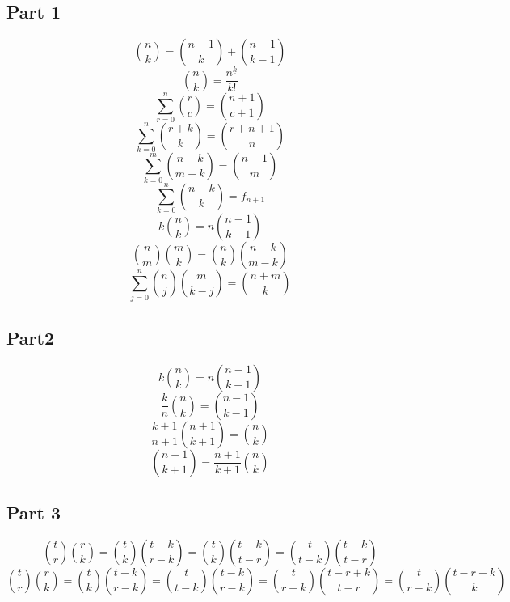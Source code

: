 
\subsection{Part 1}\label{subsec:part-1}
$$\binom{n}{k} = \binom{n-1}{k} + \binom{n-1}{k-1}$$
$$\binom{n}{k} = \frac{n^{\underline{k}}}{k!}$$
$$\sum_{r=0}^{n} \binom{r}{c} = \binom{n+1}{c+1}$$
$$\sum_{k=0}^{n} \binom{r+k}{k} = \binom{r+n+1}{n}$$
$$\sum_{k=0}^{m} \binom{n-k}{m-k} = \binom{n+1}{m}$$
$$\sum_{k=0}^{n} \binom{n-k}{k} = f_{n+1}$$
$$k \binom{n}{k} = n \binom{n-1}{k-1}$$
$$\binom{n}{m} \binom{m}{k} = \binom{n}{k} \binom{n-k}{m-k}$$
$$\sum_{j=0}^{n} \binom{n}{j} \binom{m}{k-j} = \binom{n+m}{k}$$

\subsection{Part2}\label{subsec:part2}
$$k \binom{n}{k} = n \binom{n-1}{k-1}$$
$$\frac{k}{n} \binom{n}{k} = \binom{n-1}{k-1}$$
$$\frac{k+1}{n+1} \binom{n+1}{k+1} = \binom{n}{k}$$
$$\binom{n+1}{k+1} = \frac{n+1}{k+1} \binom{n}{k}$$

\subsection{Part 3}\label{subsec:part-3}
$$\binom{t}{r} \binom{r}{k} = \binom{t}{k} \binom{t-k}{r-k} = \binom{t}{k} \binom{t-k}{t-r} = \binom{t}{t-k} \binom{t-k}{t-r}$$
$$\binom{t}{r} \binom{r}{k} = \binom{t}{k} \binom{t-k}{r-k} = \binom{t}{t-k} \binom{t-k}{r-k} = \binom{t}{r-k} \binom{t-r+k}{t-r} = \binom{t}{r-k} \binom{t-r+k}{k}$$